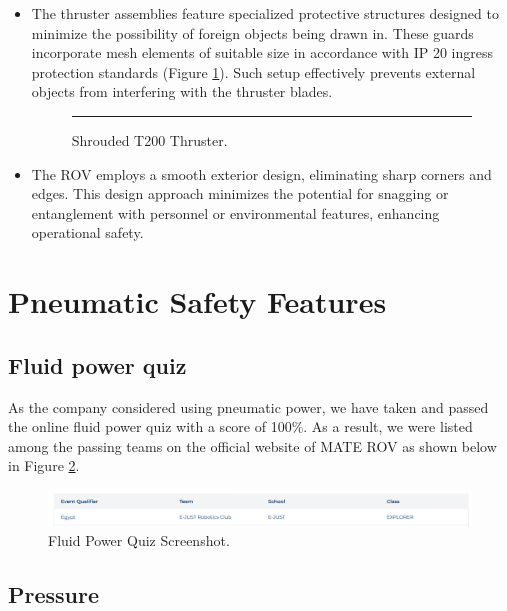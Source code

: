 \documentclass[11pt, twocolumn]{article}
\begin{document}
\begin{itemize}[leftmargin=0pt, itemindent=10pt]
    \setlength{\itemsep}{0pt}
    \item The thruster assemblies feature specialized protective structures designed to minimize the possibility of foreign objects being drawn in. These guards incorporate mesh elements of suitable size in accordance with IP 20 ingress protection standards (Figure \ref{fig:thruster}). Such setup effectively prevents external objects from interfering with the thruster blades.
    
    \begin{figure}[h!]
        \centering
        \rule{0.8\columnwidth}{4cm}
        \caption{Shrouded T200 Thruster.}
        \label{fig:thruster}
    \end{figure}

    \item The ROV employs a smooth exterior design, eliminating sharp corners and edges. This design approach minimizes the potential for snagging or entanglement with personnel or environmental features, enhancing operational safety.
\end{itemize}

\section{Pneumatic Safety Features}

\subsection{Fluid power quiz}

As the company considered using pneumatic power, we have taken and passed the online fluid power quiz with a score of 100\%. As a result, we were listed among the passing teams on the official website of MATE ROV as shown below in Figure \ref{fig:quiz}.

\begin{figure}[h!]
    \centering
    \includegraphics[width=\columnwidth]{Images/QUIZ (1).png}
    \caption{Fluid Power Quiz Screenshot.}
    \label{fig:quiz}
\end{figure}

\subsection{Pressure}
\end{document}
